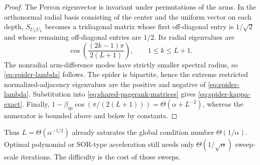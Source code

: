 \begin{proof}
The Perron eigenvector is invariant under permutations of the arms.  In the
orthonormal radial basis consisting of the center and the uniform vector on
each depth, $S_{U_LU_L}$ becomes a tridiagonal matrix whose first off-diagonal
entry is $1/\sqrt2$ and whose remaining off-diagonal entries are $1/2$.
Its radial eigenvalues are
\[
  \cos\!\left(\frac{(2k-1)\pi}{2(L+1)}\right),
  \qquad 1\leq k\leq L+1.
\]
The nonradial arm-difference modes have strictly smaller spectral radius, so
\cref{eq:spider-lambda} follows.  The spider is bipartite, hence the extreme
restricted normalized-adjacency eigenvalues are the positive and negative of
\cref{eq:spider-lambda}. Substitution into
\cref{eq:shared-pagerank-matrices} gives
\cref{eq:spider-kappa-exact}.  Finally,
$1-\beta_{\mathrm{sp}}\cos(\pi/(2(L+1)))
=\Theta(\alpha+L^{-2})$, whereas the numerator is
bounded above and below by constants.
\end{proof}

Thus $L=\Theta(\alpha^{-1/2})$ already saturates the global condition number
$\Theta(1/\alpha)$.  Optimal polynomial or SOR-type acceleration still needs
only $\Theta(1/\sqrt\alpha)$ sweep-scale iterations.  The difficulty is the
cost of those sweeps.
